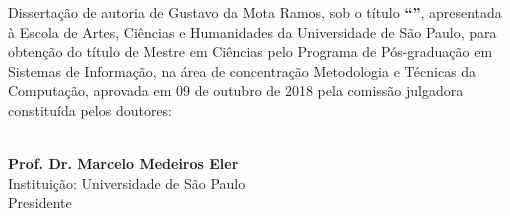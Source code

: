 \documentclass[
	12pt,				%
	oneside,			%
	a4paper,			%
	english,			%
	brazil				%
	]{abntex2ppgsi}
\begin{document}

\begin{folhadeaprovacao}
%
%
%
%
%
\noindent Dissertação de autoria de Gustavo da Mota Ramos, sob o título \textbf{``\imprimirtitulo''}, apresentada à Escola de Artes, Ciências e Humanidades da Universidade de São Paulo, para obtenção do título de Mestre em Ciências pelo Programa de Pós-graduação em Sistemas de Informação, na área de concentração Metodologia e Técnicas da Computação, aprovada em 09 de outubro de 2018 pela comissão julgadora constituída pelos doutores:

\vspace*{3cm}

\begin{center}
%
% 
% 
% 
% 
% 
%
%
\
\vspace*{0.2cm} 
\\ \textbf{Prof. Dr. Marcelo Medeiros Eler} 
\\ \vspace*{0.2cm} 
Instituição: Universidade de São Paulo
\\ \vspace*{0.2cm}
Presidente 


\end{center}
\end{folhadeaprovacao}
\end{document}
